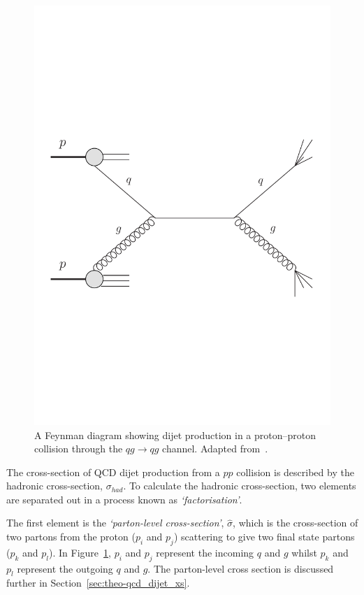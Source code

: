 \begin{figure}[!hbt]
\vspace{-1em}
  \begin{center}
    \includegraphics[width=0.65\linewidth, angle=0]{figs/Theory/qcd_dijet_feynman.pdf}
  \end{center}
  \vspace{-1em}
  \caption[A Feynman diagram showing dijet production in a proton--proton collision through the $qg \to qg$ channel.]
          {A Feynman diagram showing dijet production in a proton--proton collision through the $qg \to qg$ channel. Adapted from~\cite{theo-qcd_dijet_feynman}.}
          \label{fig:theo-qcd_dijet_feynman}
\vspace{-1em}
\end{figure}

The cross-section of QCD dijet production from a $pp$ collision is described by the hadronic cross-section, $\sigma_{had}$.
To calculate the hadronic cross-section, two elements are separated out in a process known as \textit{`factorisation'}.

The first element is the \textit{`parton-level cross-section'}, $\hat{\sigma}$, which is the cross-section of
two partons from the proton ($p_i$ and $p_j$) scattering to give two final state partons ($p_k$ and $p_l$).
In Figure~\ref{fig:theo-qcd_dijet_feynman}, $p_i$ and $p_j$ represent the incoming $q$ and $g$ whilst $p_k$ and $p_l$ represent the outgoing $q$ and $g$.
The parton-level cross section is discussed further in Section~\ref{sec:theo-qcd_dijet_xs}.

